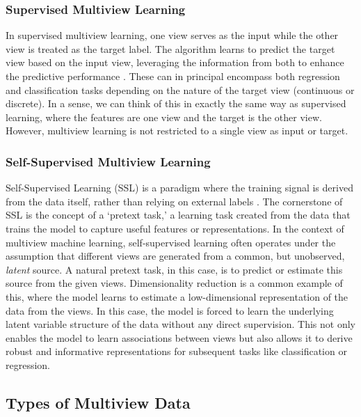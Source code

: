 \subsubsection{Supervised Multiview Learning}

In supervised multiview learning, one view serves as the input while the other view is treated as the target label.
The algorithm learns to predict the target view based on the input view, leveraging the information from both to enhance the predictive performance \citep{zong2023self}. These can in principal encompass both regression and classification tasks depending on the nature of the target view (continuous or discrete). In a sense, we can think of this in exactly the same way as supervised learning, where the features are one view and the target is the other view. However, multiview learning is not restricted to a single view as input or target.

\subsubsection{Self-Supervised Multiview Learning}

Self-Supervised Learning (SSL) is a paradigm where the training signal is derived from the data itself, rather than relying on external labels \citep{balestriero2023cookbook}.
The cornerstone of SSL is the concept of a `pretext task,' a learning task created from the data that trains the model to capture useful features or representations.
In the context of multiview machine learning, self-supervised learning often operates under the assumption that different \gls{views} are generated from a common, but unobserved, \textit{latent} source.
A natural pretext task, in this case, is to predict or estimate this source from the given \gls{views}.
Dimensionality reduction is a common example of this, where the model learns to estimate a low-dimensional representation of the data from the \gls{views}.
In this case, the model is forced to learn the underlying latent variable structure of the data without any direct supervision.
This not only enables the model to learn associations between \gls{views} but also allows it to derive robust and informative representations for subsequent tasks like classification or regression.

\subsection{Types of Multiview Data}

